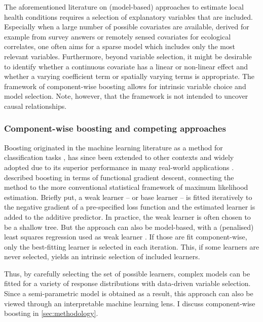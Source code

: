 The aforementioned literature on (model-based) approaches to estimate local health conditions requires a selection of explanatory variables that are included. Especially when a large number of possible covariates are available, derived for example from survey answers or remotely sensed covariates for ecological correlates, one often aims for a sparse model which includes only the most relevant variables. Furthermore, beyond variable selection, it might be desirable to identify whether a continuous covariate has a linear or non-linear effect and whether a varying coefficient term or spatially varying terms is appropriate. The framework of component-wise boosting allows for intrinsic variable choice and model selection. Note, however, that the framework is not intended to uncover causal relationships.


\subsubsection*{Component-wise boosting and competing approaches}\label{sec:component-wise-boosting-and-competing-approaches}

Boosting originated in the machine learning literature as a method for classification tasks \autocite{freundExperimentsNewBoosting1996}, has since been extended to other contexts and widely adopted due to its superior performance in many real-world applications \autocite{chenXGBoostScalableTree2016}.  \textcite{friedmanAdditiveLogisticRegression2000, friedmanGreedyFunctionApproximation2001} described boosting in terms of functional gradient descent, connecting the method to the more conventional statistical framework of maximum likelihood estimation. Briefly put, a weak learner -- or base learner -- is fitted iteratively to the negative gradient of a pre-specified loss function and the estimated learner is added to the additive predictor. In practice, the weak learner is often chosen to be a shallow tree. But the approach can also be model-based, with a (penalised) least squares regression used as weak learner \autocite{buhlmannBoostingLossRegression2003}. If those are fit component-wise, only the best-fitting learner is selected in each iteration. This, if some learners are never selected, yields an intrinsic selection of included learners.

Thus, by carefully selecting the set of possible learners, complex models can be fitted for a variety of response distributions with data-driven variable selection. Since a semi-parametric model is obtained as a result, this approach can also be viewed through an interpretable machine learning lens. I discuss component-wise boosting in \autoref{sec:methodology}.

